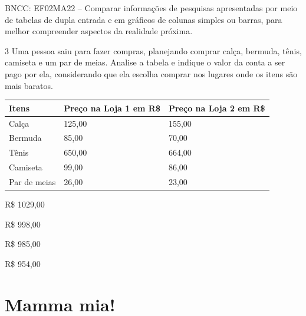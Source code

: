 \begin{escolha}
\begin{escolha}
{BNCC: EF02MA22 -- Comparar informações de pesquisas apresentadas por meio
de tabelas de dupla entrada e em gráficos de colunas simples ou barras, para melhor
compreender aspectos da realidade próxima.}

\num{3} Uma pessoa saiu para fazer compras, planejando comprar calça, bermuda, tênis, camiseta e um par de meias. Analise a tabela e indique o valor da conta a ser pago por ela, considerando que ela escolha comprar nos lugares onde os
itens são mais baratos.

\begin{longtable}[]{@{}lll@{}}
\toprule
Itens & Preço na Loja 1 em R\$ & Preço na Loja 2 em R\$\tabularnewline
\midrule
\endhead
Calça & 125,00 & 155,00\tabularnewline
Bermuda & 85,00 & 70,00\tabularnewline
Tênis & 650,00 & 664,00\tabularnewline
Camiseta & 99,00 & 86,00\tabularnewline
Par de meias & 26,00 & 23,00\tabularnewline
\bottomrule
\end{longtable}

\begin{minipage}{.5\textwidth}
\begin{escolha}
\item R\$ 1029,00

\item R\$ 998,00

\item R\$ 985,00

\item R\$ 954,00
\end{escolha}
\end{minipage}

\chapter{Mamma mia!}




\end{escolha}
\end{escolha}
